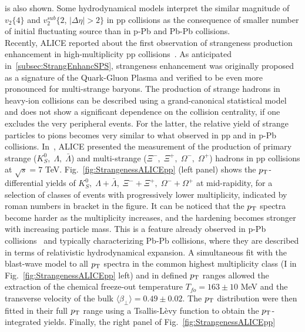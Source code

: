 is also shown. Some hydrodynamical models interpret the similar magnitude 
of $v_2 \{4\}$ and $v_2^{sub} \{2$, $|\Delta \eta| > 2\}$ in pp collisions as the 
consequence of smaller number of initial fluctuating source than in p-Pb and 
Pb-Pb collisions.\\
Recently, ALICE reported about the first observation of strangeness production
 enhancement in high-multiplicity pp collisions~\cite{ALICE:2017jyt}. As 
 anticipated in~\ref{subsec:StrangEnhancSPS}, strangeness enhancement 
 was originally proposed as a signature of the Quark-Gluon Plasma and 
 verified to be even more pronounced for multi-strange baryons. The production 
 of strange hadrons in heavy-ion collisions can be described using a 
 grand-canonical statistical model and does not show a significant dependence 
 on the collision centrality, if one excludes the very peripheral events. For the latter,
  the relative yield of strange particles to pions becomes very similar to what 
  observed in pp and in p-Pb~\cite{Abelev:2013haa,Adam:2015vsf} collisions. In~\cite{ALICE:2017jyt}, ALICE presented the
   measurement of the production of primary strange ($K^0_S,\; \Lambda,\; \bar{\Lambda}$) 
   and multi-strange ($\Xi^-,\; \Xi^+,\; \Omega^-,\; \Omega^+$) hadrons in pp 
   collisions at $\sqrt{s} = 7$ TeV. Fig.~\ref{fig:StrangenessALICEpp} (left panel) 
   shows the $p_{\rm T}$-differential yields of 
   $K^0_S,\; \Lambda + \bar{\Lambda},\; \Xi^- + \Xi^+,\; \Omega^- + \Omega^+$ 
   at mid-rapidity, for a selection of classes of events with progressively lower 
   multiplicity, indicated by roman numbers in bracket in the figure. It can be 
   noticed that the $p_{\rm T}$ spectra become harder as the multiplicity increases, 
   and the hardening becomes stronger with increasing particle mass. This is
    a feature already observed in p-Pb collisions~\cite{Abelev:2013haa} and 
    typically characterizing Pb-Pb collisions, where they are described in terms 
    of relativistic hydrodynamical expansion. A simultaneous fit with the 
    blast-wave model to all $p_{\rm T}$ spectra in the common highest multiplicity class 
    (I in Fig.~\ref{fig:StrangenessALICEpp} left) and in defined $p_{\rm T}$ ranges allowed the 
    extraction of the chemical freeze-out temperature $T_{fo} = 163 \pm 10$ 
    MeV and the transverse velocity of the bulk 
    $\langle \beta_{\perp} \rangle = 0.49 \pm 0.02$. The $p_{\rm T}$ distribution were
     then fitted in their full $p_{\rm T}$ range using a Tsallis-Lèvy function to obtain the 
     $p_{\rm T}$-integrated yields. Finally, the right panel of Fig.~\ref{fig:StrangenessALICEpp}

